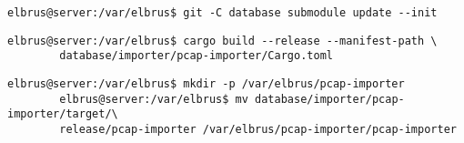 	\lstset{style=commands}
	\begin{lstlisting}[caption={Updaten der git Submodule.}]
		elbrus@server:/var/elbrus$ git -C database submodule update --init
	\end{lstlisting}
	
	\lstset{style=commands}
	\begin{lstlisting}[caption={Kompilieren des 'pcap-importers'.}]
		elbrus@server:/var/elbrus$ cargo build --release --manifest-path \
		database/importer/pcap-importer/Cargo.toml
	\end{lstlisting}
	
	\lstset{style=commands}
	\begin{lstlisting}[caption={Kopieren des 'pcap-importers' in ein eigenes Verzeichniss.}]
		elbrus@server:/var/elbrus$ mkdir -p /var/elbrus/pcap-importer
		elbrus@server:/var/elbrus$ mv database/importer/pcap-importer/target/\
		release/pcap-importer /var/elbrus/pcap-importer/pcap-importer
	\end{lstlisting}
